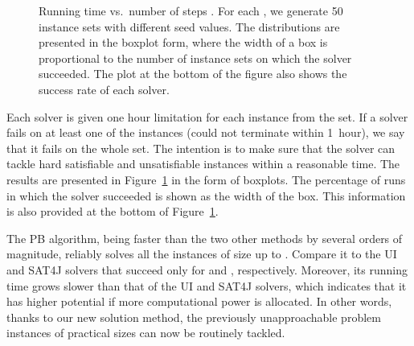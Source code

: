 \documentclass[runningheads,proof]{llncs}
\begin{document}
\begin{figure}
\endpgfgraphicnamed
 
\caption{Running time vs.\ number of steps . For each , we generate 50 instance sets with different seed values.  
The distributions are presented in the boxplot form, where the width of a box is proportional to the number of instance sets on which the solver succeeded.  
The plot at the bottom of the figure also shows the success rate of each solver.}
\label{fig:change-k}
\end{figure}
Each solver is given one hour limitation for each instance from the set. 
If a solver fails on at least one of the instances (could not terminate within 1~hour), we say that it fails on the whole set.
The intention is to make sure that the solver can tackle hard satisfiable and unsatisfiable instances within a reasonable time.
The results are presented in Figure~\ref{fig:change-k} in the form of boxplots.
The percentage of runs in which the solver succeeded is shown as the width of the box.
This information is also provided at the bottom of Figure~\ref{fig:change-k}.

The PB algorithm, being faster than the two other methods by several orders of magnitude, reliably solves all the instances of size up to .
Compare it to the UI and SAT4J solvers that succeed only for  and , respectively.
Moreover, its running time grows slower than that of the UI and SAT4J solvers, which indicates that it has higher potential if more computational power is allocated.
In other words, thanks to our new solution method, the previously unapproachable problem instances of practical sizes can now be routinely tackled.
\end{document}
